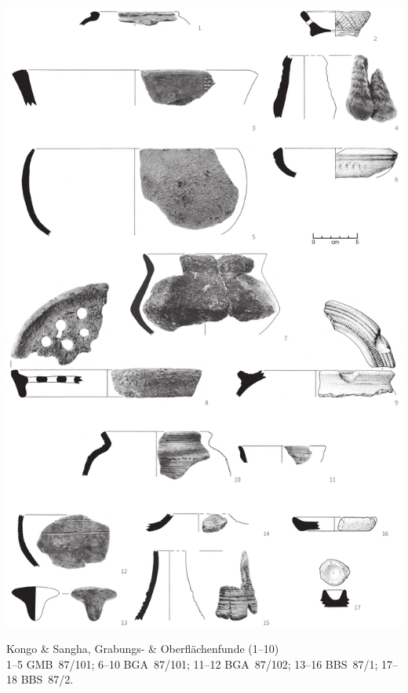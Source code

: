 \begin{pl}[H]
	\includegraphics{plt/Taf33.pdf}
	\vspace{.75em}\caption{Kongo \& \mbox{Sangha}, Grabungs- \& Oberflächenfunde (1--10) \\ 1--5 GMB~87/101; 6--10 BGA~87/101; 11--12 BGA~87/102; 13--16 BBS~87/1; 17--18 BBS~87/2.}
	\label{pl:33}
\end{pl}

